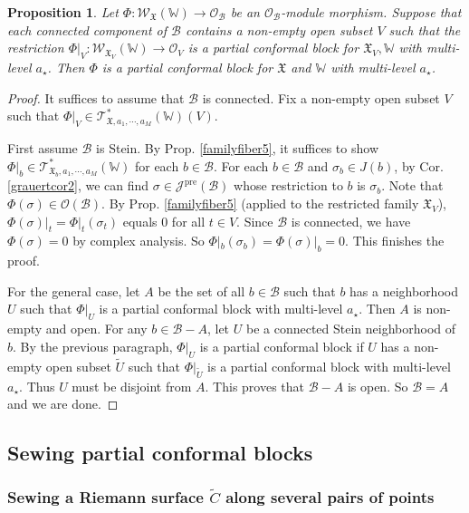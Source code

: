 \documentclass[11pt,b5paper,notitlepage]{article}
\theoremstyle{definition}
\theoremstyle{plain}
\newtheorem{pp}[df]{Proposition}
\newcommand{\fk}{\mathfrak}
\newcommand{\mc}{\mathcal}
\newcommand{\wtd}{\widetilde}
\newcommand{\scr}{\mathscr}
\newcommand{\Wbb}{\mathbb W}
\newcommand{\<}{\left\langle}
\renewcommand{\>}{\right\rangle}
\newcommand{\MO}{\mathcal{O}}
\newcommand{\MB}{\mathcal{B}}
\newcommand{\fx}{\mathfrak{X}}
\newcommand{\ST}{\mathscr{T}}
\newcommand{\SW}{\mathscr{W}}
\newcommand{\pre}{\mathrm{pre}}
\numberwithin{equation}{subsection}
\begin{document}
\begin{pp}\label{localglobal1}
    Let $\Phi:\SW_\fx(\Wbb)\rightarrow \MO_\MB$ be an $\MO_\MB$-module morphism. Suppose that each connected component of $\MB$ contains a non-empty open subset $V$ such that the restriction $\Phi|_V:\SW_{\fx_V}(\Wbb)\rightarrow \MO_V$ is a partial conformal block for $\fk X_V,\Wbb$ with multi-level $a_\star$. Then $\Phi$ is a partial conformal block for $\fx$ and $\Wbb$ with multi-level $a_\star$.
\end{pp}
\begin{proof}
It suffices to assume that $\MB$ is connected. Fix a non-empty open subset $V$ such that $\Phi\vert_V\in \ST_{\fx,a_1,\cdots,a_M}^*(\Wbb)(V)$.
     
First assume $\MB$ is Stein. By Prop. \ref{familyfiber5}, it suffices to show $\Phi\vert_b\in \ST_{\fx_b,a_1,\cdots,a_M}^*(\Wbb)$ for each $b\in \MB$. For each $b\in \MB$ and $\sigma_b\in J(b)$, by Cor. \ref{grauertcor2}, we can find $\sigma\in \scr J^\pre(\mc B)$ whose restriction to $b$ is $\sigma_b$. Note that $\Phi(\sigma)\in\mc O(\mc B)$. By Prop. \ref{familyfiber5} (applied to the restricted family $\fk X_V$), $\Phi(\sigma)\vert_t=\Phi\vert_t(\sigma_t)$ equals $0$ for all $t\in V$. Since $\mc B$ is connected, we have $\Phi(\sigma)=0$ by complex analysis. So $\Phi|_b(\sigma_b)=\Phi(\sigma)|_b=0$. This finishes the proof.
     
For the general case, let $A$ be the set of all $b\in \MB$ such that $b$ has a neighborhood $U$ such that $\Phi\vert_U$ is a partial conformal block with multi-level $a_\star$. Then $A$ is non-empty and open. For any $b\in \MB-A$, let $U$ be a connected Stein neighborhood of $b$. By the previous paragraph, $\Phi\vert_U$ is a partial conformal block if $U$ has a non-empty open subset $\wtd U$ such that $\Phi\vert_{\wtd U}$ is a partial conformal block with multi-level $a_\star$. Thus $U$ must be disjoint from $A$. This proves that $\MB-A$ is open. So $\MB=A$ and we are done.
\end{proof}



\subsection{Sewing partial conformal blocks}\label{lb76}


\subsubsection{Sewing a Riemann surface $\wtd C$ along several pairs of points} \label{lb6}
\end{document}

